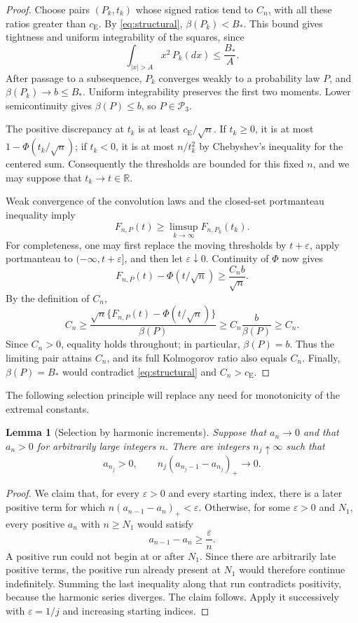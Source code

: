 \documentclass[aop]{imsart}
\theoremstyle{plain}
\newtheorem{lemma}[theorem]{Lemma}
\theoremstyle{definition}
\theoremstyle{definition}
\newcommand{\R}{\mathbb R}
\newcommand{\Pthree}{\mathcal P_3}
\newcommand{\ce}{c_{\mathrm E}}
\begin{document}
\begin{proof}
Choose pairs \((P_k,t_k)\) whose signed ratios tend to \(C_n\), with all
these ratios greater than \(\ce\). By \eqref{eq:structural},
\(\beta(P_k)<B_*\). This bound gives tightness and uniform integrability
of the squares, since
\[
\int_{|x|>A}x^2\,P_k(dx)\le \frac{B_*}{A}.
\]
After passage to a subsequence, \(P_k\) converges weakly to a probability
law \(P\), and \(\beta(P_k)\to b\le B_*\). Uniform integrability preserves
the first two moments. Lower semicontinuity gives
\(\beta(P)\le b\), so \(P\in\Pthree\).

The positive discrepancy at \(t_k\) is at least \(\ce/\sqrt n\). If
\(t_k\ge0\), it is at most \(1-\Phi(t_k/\sqrt n)\); if \(t_k<0\), it is
at most \(n/t_k^2\) by Chebyshev's inequality for the centered sum.
Consequently the thresholds are bounded for this fixed \(n\), and we
may suppose that \(t_k\to t\in\R\).

Weak convergence of the convolution laws and the closed-set
portmanteau inequality imply
\[
F_{n,P}(t)\ge\limsup_{k\to\infty}F_{n,P_k}(t_k).
\]
For completeness, one may first replace the moving thresholds by
\(t+\varepsilon\), apply portmanteau to \(( -\infty,t+\varepsilon]\),
and then let \(\varepsilon\downarrow0\). Continuity of \(\Phi\) now gives
\[
F_{n,P}(t)-\Phi(t/\sqrt n)\ge\frac{C_n b}{\sqrt n}.
\]
By the definition of $C_n$,
\[
 C_n\ge
 \frac{\sqrt n\{F_{n,P}(t)-\Phi(t/\sqrt n)\}}{\beta(P)}
 \ge C_n\frac b{\beta(P)}\ge C_n.
\]
Since $C_n>0$, equality holds throughout; in particular,
$\beta(P)=b$. Thus the limiting pair attains $C_n$, and its full
Kolmogorov ratio also equals $C_n$. Finally, \(\beta(P)=B_*\) would contradict
\eqref{eq:structural} and \(C_n>\ce\).
\end{proof}

The following selection principle will replace any need for
monotonicity of the extremal constants.

\begin{lemma}[Selection by harmonic increments]
\label{lem:selection}
Suppose that \(a_n\to0\) and that \(a_n>0\) for arbitrarily large
integers \(n\). There are integers \(n_j\uparrow\infty\) such that
\begin{equation}
\label{eq:harmonic-selection}
a_{n_j}>0,
\qquad
n_j(a_{n_j-1}-a_{n_j})_+\longrightarrow0.
\end{equation}
\end{lemma}

\begin{proof}
We claim that, for every \(\varepsilon>0\) and every starting index,
there is a later positive term for which
\(n(a_{n-1}-a_n)_+<\varepsilon\). Otherwise, for some
\(\varepsilon>0\) and \(N_1\), every positive \(a_n\) with \(n\ge N_1\)
would satisfy
\[
a_{n-1}-a_n\ge\frac{\varepsilon}{n}.
\]
A positive run could not begin at or after \(N_1\). Since there are
arbitrarily late positive terms, the positive run already present at
\(N_1\) would therefore continue indefinitely. Summing the last
inequality along that run contradicts positivity, because the harmonic
series diverges. The claim follows. Apply it successively with
\(\varepsilon=1/j\) and increasing starting indices.
\end{proof}
\end{document}
